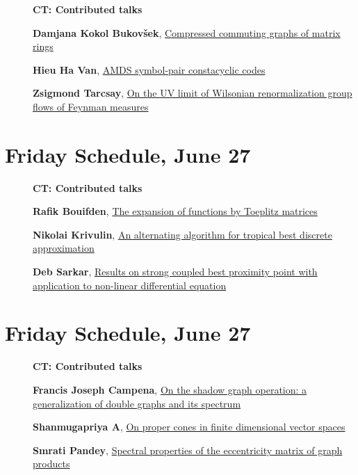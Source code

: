 \documentclass[ILAS2025-program.tex]{subfiles}
\begin{document}
        \begin{description}
    \item[] {\color{mstitle}\textbf{CT: Contributed talks}} 
    \item[] \hypertarget{up0416}{}\textbf{Damjana Kokol Bukovšek}, \hyperlink{down0416}{Compressed commuting graphs of matrix rings}
        \item[] \hypertarget{up0417}{}\textbf{Hieu Ha Van}, \hyperlink{down0417}{AMDS symbol-pair constacyclic codes}
        \item[] \hypertarget{up0418}{}\textbf{Zsigmond Tarcsay}, \hyperlink{down0418}{On the UV limit of Wilsonian renormalization group flows of Feynman measures}
        \end{description}
    \newpage

\section*{Friday Schedule, June 27 }
        
        \begin{description}
    \item[] {\color{mstitle}\textbf{CT: Contributed talks}} 
    \item[] \hypertarget{up0419}{}\textbf{Rafik Bouifden}, \hyperlink{down0419}{The expansion of functions by Toeplitz matrices}
        \item[] \hypertarget{up0420}{}\textbf{Nikolai Krivulin}, \hyperlink{down0420}{An alternating algorithm for tropical best discrete approximation}
        \item[] \hypertarget{up0421}{}\textbf{Deb Sarkar}, \hyperlink{down0421}{Results on strong coupled best proximity point with application to non-linear differential equation}
        \end{description}
    \newpage

\section*{Friday Schedule, June 27 }
        
        \begin{description}
    \item[] {\color{mstitle}\textbf{CT: Contributed talks}} 
    \item[] \hypertarget{up0422}{}\textbf{Francis Joseph Campena}, \hyperlink{down0422}{On the shadow graph operation: a generalization of double graphs and its spectrum}
        \item[] \hypertarget{up0423}{}\textbf{Shanmugapriya A}, \hyperlink{down0423}{On proper cones in finite dimensional vector spaces}
        \item[] \hypertarget{up0424}{}\textbf{Smrati Pandey}, \hyperlink{down0424}{Spectral properties of the eccentricity matrix of graph products}
        \end{description}
    \newpage
\end{document}
